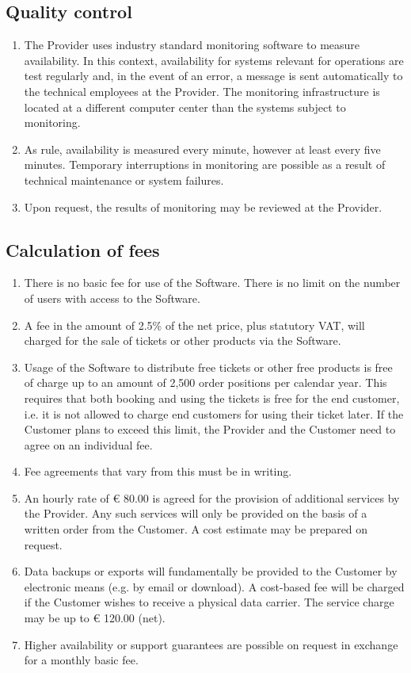 \documentclass{terms}
\begin{document}
\subsection{Quality control}
\begin{enumerate}
\item The Provider uses industry standard monitoring software to measure availability. In this context, availability for systems relevant for operations are test regularly and, in the event of an error, a message is sent automatically to the technical employees at the Provider. The monitoring infrastructure is located at a different computer center than the systems subject to monitoring.
\item As rule, availability is measured every minute, however at least every five minutes. Temporary interruptions in monitoring are possible as a result of technical maintenance or system failures.
\item Upon request, the results of monitoring may be reviewed at the Provider.
\end{enumerate}

\subsection{Calculation of fees}
\label{entgelt}
\begin{enumerate}
\item There is no basic fee for use of the Software. There is no limit on the number of users with access to the Software.
\item A fee in the amount of 2.5\% of the net price, plus statutory VAT, will charged for the sale of tickets or other products via the Software.
\item Usage of the Software to distribute free tickets or other free products is free of charge up to an amount of 2,500 order positions per calendar year. This requires that both booking and using the tickets is free for the end customer, i.e. it is not allowed to charge end customers for using their ticket later. If the Customer plans to exceed this limit, the Provider and the Customer need to agree on an individual fee.
\item Fee agreements that vary from this must be in writing.
\item An hourly rate of € 80.00 is agreed for the provision of additional services by the Provider. Any such services will only be provided on the basis of a written order from the Customer. A cost estimate may be prepared on request.
\item Data backups or exports will fundamentally be provided to the Customer by electronic means (e.g. by email or download). A cost-based fee will be charged if the Customer wishes to receive a physical data carrier. The service charge may be up to € 120.00 (net).
\item Higher availability or support guarantees are possible on request in exchange for a monthly basic fee.
\end{enumerate}
\end{document}
